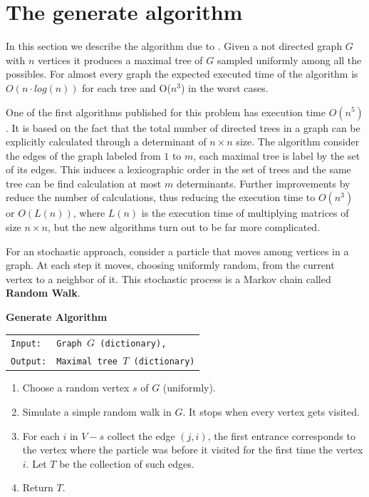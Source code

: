 
\chapter{The generate algorithm} %

\label{AppendixA} %


In this section we describe the algorithm due to \cite[Broder 89]{Broder89}. Given a not directed graph $G$ with $n$ vertices it produces a maximal tree of $G$ sampled uniformly among all the possibles. For almost every graph the expected executed time of the algorithm is $O(n\cdot log(n) )$ for each tree and O($n^{3}$) in the worst cases. 

One of the first algorithms published for this problem has execution time $O (n^{5})$. It is based on the fact that the total number of directed trees in a graph can be explicitly calculated through a determinant of $n \times n$ size. The algorithm consider the edges of the graph labeled from $1$ to $m$, each maximal tree is label by the set of its edges. This induces a lexicographic order in the set of trees and the same tree can be find calculation at most $m$ determinants. Further improvements by \cite[Colbourn 89]{CDM88} reduce the number of calculations, thus reducing the execution time to $O(n^3)$ or $O(L(n))$, where $L(n)$ is the execution time of multiplying matrices of size $n\times n$, but the new algorithms turn out to be far more complicated.

For an stochastic approach, consider a particle that moves among vertices in a graph. At each step it moves, choosing uniformly random, from the current vertex to a neighbor of it. This stochastic process is a Markov chain called \textbf{Random Walk}.

\begin{cajita}
\textbf{Generate Algorithm}\hfill \break
\begin{tabular}{ l l }
\texttt{Input:} &  \texttt{Graph $G$ (dictionary),} \\
\texttt{Output:} & \texttt{Maximal tree $T$ (dictionary)} \\
\end{tabular}

\begin{enumerate}
\item Choose a random vertex $s$ of $G$ (uniformly).
\item Simulate a simple random walk in $G$. It stops when every vertex gets visited. 
\item For each $i$ in $V-s$ collect the edge $(j,i)$, the first entrance corresponds to the vertex where the particle was before it visited for the first time the vertex $i$. Let $T$ be the collection of such edges.
\item Return $T$.
\end{enumerate}
\end{cajita}

